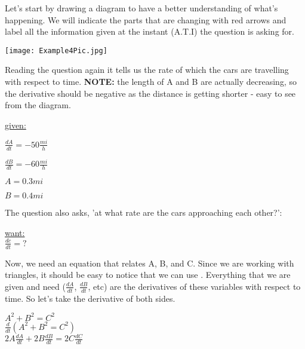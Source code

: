 \documentclass[12pt,fleqn]{book} %
\begin{document}
\noindent Let's start by drawing a diagram to have a better understanding of what's happening. We will indicate the parts that are changing with red arrows and
label all the information given at the instant (A.T.I) the question is asking for.

\begin{center}
    \texttt{[image: Example4Pic.jpg]}
\end{center}

\noindent Reading the question again it tells us the rate of which the cars are travelling with respect to time. \textbf{NOTE:} the length of A and B are actually
decreasing, so the derivative should be negative as the distance is getting shorter - easy to see from the diagram.

\pagebreak

\begin{center}
    \underline{given:}
    \begin{multicols}{4}
        $\frac{dA}{dt}=-50 \frac{mi}{h}$

        $\frac{dB}{dt}=-60 \frac{mi}{h}$

        $A=0.3mi$

        $B=0.4mi$
    \end{multicols}
\end{center}

\noindent The question also asks, 'at what rate are the cars approaching each other?':

\begin{center}
    \underline{want:} \\
    $\frac{dc}{dt}=?$
\end{center}

\noindent Now, we need an equation that relates A, B, and C. Since we are working with triangles, it should be easy to notice that we can use .
Everything that we are given and need ($\frac{dA}{dt}$, $\frac{dB}{dt}$, etc) are the derivatives of these variables with respect to time. So let's take the derivative of both sides.

\begin{center}
    $A^2+B^2=C^2$ \\
    \vspace*{1mm}
    $\frac{d}{dt}(A^2+B^2=C^2)$ \\
    \vspace*{1mm}
    $2A\frac{dA}{dt}+2B\frac{dB}{dt}=2C\frac{dC}{dt}$
\end{center}
\end{document}
